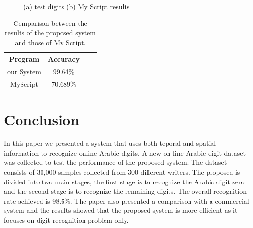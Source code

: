 \documentclass[10pt]{IEEEtran}
\begin{document}
\begin{figure}[h]
\centering


 \caption{(a) test digits (b) My Script results}
\end{figure}


\begin{table}[h]
\begin{center}
\caption[Results]{Comparison between the results of the proposed system and those of My Script.}
 \begin{tabular}{|c|c|c|c|}
 \hline


Program   & Accuracy \\ \hline
our System  & 99.64\% \\ \hline
MyScript & 70.689\%  \\ \hline

\end{tabular}
\label{tab:ResultsMyScript}
\end{center}
\end{table}


\section{Conclusion}
\label{sec:Conclusion}
In this paper we presented a system that uses both teporal and spatial information to recognize online Arabic  digits. A new on-line Arabic digit dataset was collected to test the performance of the proposed system. The dataset consists of 30,000 samples collected from 300 different writers. The proposed is divided into two main stages, the first stage is to recognize the Arabic digit zero and the second stage is to recognize the remaining digits. The overall recognition rate achieved is 98.6\%. The paper also presented a comparison with a commercial system and the results showed that the proposed system is more efficient as it focuses on digit recognition problem only.
\end{document}
